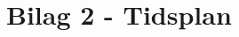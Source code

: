 \documentclass[main.tex]{subfiles}
\begin{document}
\chapter{Bilag 2 - Tidsplan}
\label{tidsplan}



\end{document}
